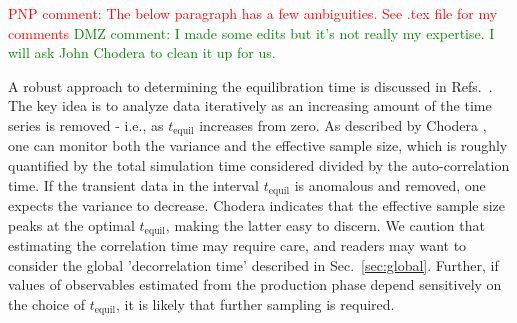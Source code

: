 \textcolor{red}{PNP comment: The below paragraph has a few ambiguities. See .tex file for my comments}
\textcolor{green}{DMZ comment: I made some edits but it's not really my expertise.  I will ask John Chodera to clean it up for us.}

A robust approach to determining the equilibration time is discussed in Refs.\ \cite{Yang2004,Chodera-2016}.
The key idea is to analyze data iteratively as an increasing amount of the time series is removed - i.e., as $t_{\mathrm{equil}}$ increases from zero.  
As described by Chodera \cite{Chodera-2016}, one can monitor both the variance and the effective sample size, which is roughly quantified by the total simulation time considered divided by the auto-correlation time.
If the transient data in the interval $t_{\mathrm{equil}}$ is anomalous and removed, one expects the variance to decrease.
Chodera indicates that the effective sample size peaks at the optimal $t_{\mathrm{equil}}$, making the latter easy to discern.
We caution that estimating the correlation time may require care, and readers may want to consider the global 'decorrelation time' \cite{Lyman2007a} described in Sec.\ \ref{sec:global}.  Further, if values of observables estimated from the production phase depend sensitively on the choice of $t_{\mathrm{equil}}$, it is likely that further sampling is required.


